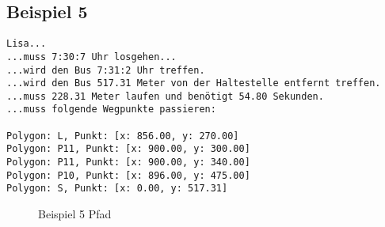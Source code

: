 \documentclass[a4paper,10pt,ngerman]{scrartcl}
\begin{document}
\subsection{Beispiel 5}
\begin{verbatim}
Lisa...
...muss 7:30:7 Uhr losgehen...
...wird den Bus 7:31:2 Uhr treffen.
...wird den Bus 517.31 Meter von der Haltestelle entfernt treffen.
...muss 228.31 Meter laufen und benötigt 54.80 Sekunden.
...muss folgende Wegpunkte passieren:

Polygon: L, Punkt: [x: 856.00, y: 270.00]
Polygon: P11, Punkt: [x: 900.00, y: 300.00]
Polygon: P11, Punkt: [x: 900.00, y: 340.00]
Polygon: P10, Punkt: [x: 896.00, y: 475.00]
Polygon: S, Punkt: [x: 0.00, y: 517.31]
\end{verbatim}
\begin{figure}[H]
  \def\svgwidth{\columnwidth} 
  
  \caption{Beispiel 5 Pfad}
\end{figure}
\end{document}
